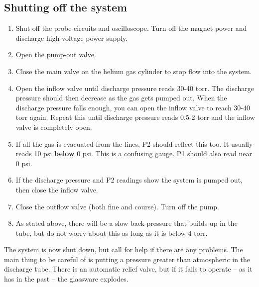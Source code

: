 \documentclass{../lab}
\begin{document}

\subsection{Shutting off the system}

\begin{enumerate}
    \item Shut off the probe circuits and oscilloscope. Turn off the magnet power and discharge high-voltage power supply.

    \item Open the pump-out valve.

    \item Close the main valve on the helium gas cylinder to stop flow into the system.

    \item Open the inflow valve until discharge pressure reads 30-40 torr. The discharge pressure should then decrease as the gas gets pumped out. When the discharge pressure falls enough, you can open the inflow valve to reach 30-40 torr again. Repeat this until discharge pressure reads 0.5-2 torr and the inflow valve is completely open.

    \item If all the gas is evacuated from the lines, P2 should reflect this too. It usually reads 10 psi \textbf{below} 0 psi. This is a confusing gauge. P1 should also read near 0 psi.

    \item If the discharge pressure and P2 readings show the system is pumped out, then close the inflow valve.

    \item Close the outflow valve (both fine and course). Turn off the pump.

    \item As stated above, there will be a slow back-pressure that builds up in the tube, but do not worry about this as long as it is below 4 torr.
\end{enumerate}

\noindent The system is now shut down, but call for help if there are any problems. The main thing to be careful of is putting a pressure greater than atmospheric in the discharge tube. There is an automatic relief valve, but if it fails to operate -- as it has in the past -- the glassware explodes.
\end{document}
